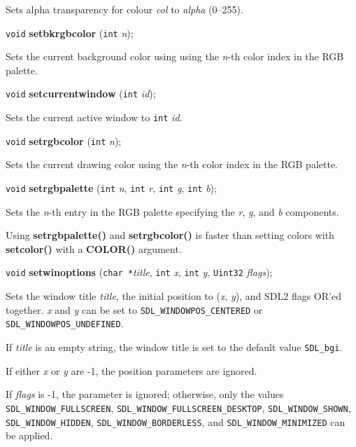 \documentclass[a4paper,11pt]{article}
\newcommand{\V}{\texttt{void}}      %
\newcommand{\I}{\texttt{int}}       %
\newcommand{\Ut}{\texttt{Uint32}}   %
\newcommand{\C}{\texttt{char *}}    %
\newcommand{\func}[1]{\textbf{#1}}  %
\newcommand{\A}[1]{\emph{#1}}       %
\newcommand{\T}[1]{\texttt{#1}}     %
\newenvironment{bgi}
{ %
  \begin{snugshade}
}
{ %
  \end{snugshade}
}
\begin{document}
Sets alpha transparency for colour \A{col} to \A{alpha} (0--255).


\begin{bgi}
\V{} \func{setbkrgbcolor} (\I{} \A{n}); 
\end{bgi}

Sets the current background color using using the \A{n}-th color index
in the RGB palette.

\begin{bgi}
\V{} \func{setcurrentwindow} (\I{} \A{id}); 
\end{bgi}

Sets the current active window to \I{} \A{id}.


\begin{bgi}
\V{} \func{setrgbcolor} (\I{} \A{n}); 
\end{bgi}

Sets the current drawing color using the \A{n}-th color index in the
RGB palette.


\begin{bgi}
\V{} \func{setrgbpalette} (\I{} \A{n}, \I{} \A{r}, \I{} \A{g}, \I{} \A{b}); 
\end{bgi}

Sets the \A{n}-th entry in the RGB palette specifying the \A{r},
\A{g}, and \A{b} components.

Using \func{setrgbpalette()} and \func{setrgbcolor()} is faster than
setting colors with \func{setcolor()} with a \func{COLOR()} argument.


\begin{bgi}
\V{} \func{setwinoptions} (\C{}\A{title}, \I{} \A{x}, \I{} \A{y}, 
  \Ut{} \A{flags});
\end{bgi}

Sets the window title \A{title}, the initial position to (\A{x},
\A{y}), and SDL2 flags OR'ed together. \A{x} and \A{y} can be set to
\T{SDL\_WINDOWPOS\_CENTERED} or \T{SDL\_WINDOWPOS\_UNDEFINED}.

If \A{title} is an empty string, the window title is set to the
default value \T{SDL\_bgi}.

If either \A{x} or \A{y} are -1, the position parameters are ignored.

If \A{flags} is -1, the parameter is ignored; otherwise, only the
values \T{SDL\_WINDOW\_FULLSCREEN},
\T{SDL\_WINDOW\_FULLSCREEN\_DESKTOP}, \T{SDL\_WINDOW\_SHOWN},
\T{SDL\_WINDOW\_HIDDEN}, \T{SDL\_WINDOW\-\_BORDERLESS}, and
\T{SDL\_WINDOW\_MINIMIZED} can be applied.
\end{document}

